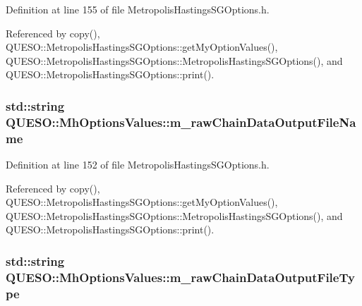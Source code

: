 Definition at line 155 of file Metropolis\-Hastings\-S\-G\-Options.\-h.



Referenced by copy(), Q\-U\-E\-S\-O\-::\-Metropolis\-Hastings\-S\-G\-Options\-::get\-My\-Option\-Values(), Q\-U\-E\-S\-O\-::\-Metropolis\-Hastings\-S\-G\-Options\-::\-Metropolis\-Hastings\-S\-G\-Options(), and Q\-U\-E\-S\-O\-::\-Metropolis\-Hastings\-S\-G\-Options\-::print().

\hypertarget{class_q_u_e_s_o_1_1_mh_options_values_a0ff310cdab62e1bdbff8663f8a6b1c77}{
\subsubsection[{m\-\_\-raw\-Chain\-Data\-Output\-File\-Name}]{\setlength{\rightskip}{0pt plus 5cm}std\-::string Q\-U\-E\-S\-O\-::\-Mh\-Options\-Values\-::m\-\_\-raw\-Chain\-Data\-Output\-File\-Name}}\label{class_q_u_e_s_o_1_1_mh_options_values_a0ff310cdab62e1bdbff8663f8a6b1c77}


Definition at line 152 of file Metropolis\-Hastings\-S\-G\-Options.\-h.



Referenced by copy(), Q\-U\-E\-S\-O\-::\-Metropolis\-Hastings\-S\-G\-Options\-::get\-My\-Option\-Values(), Q\-U\-E\-S\-O\-::\-Metropolis\-Hastings\-S\-G\-Options\-::\-Metropolis\-Hastings\-S\-G\-Options(), and Q\-U\-E\-S\-O\-::\-Metropolis\-Hastings\-S\-G\-Options\-::print().

\hypertarget{class_q_u_e_s_o_1_1_mh_options_values_ae435f8be38f9f6407a2e0f75c53b4e76}{
\subsubsection[{m\-\_\-raw\-Chain\-Data\-Output\-File\-Type}]{\setlength{\rightskip}{0pt plus 5cm}std\-::string Q\-U\-E\-S\-O\-::\-Mh\-Options\-Values\-::m\-\_\-raw\-Chain\-Data\-Output\-File\-Type}}\label{class_q_u_e_s_o_1_1_mh_options_values_ae435f8be38f9f6407a2e0f75c53b4e76}


